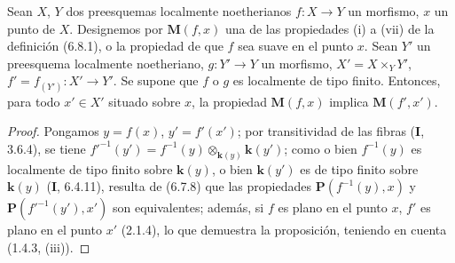 \begin{proposition}[6.8.2]
\label{IV.2.s6.8.2-fr}
Sean $X$, $Y$ dos preesquemas localmente noetherianos $f:X\to Y$ un
morfismo, $x$ un punto de $X$. Designemos por $\boldsymbol{M}(f,x)$ una de las propiedades
\textup{(i)} a \textup{(vii)} de la definición \textup{(6.8.1)}, o la propiedad de que $f$ sea suave en el
punto $x$. Sean $Y'$ un preesquema localmente noetheriano, $g:Y'\to Y$ un
morfismo, $X'=X\times_Y Y'$, $f'=f_{(Y')}:X'\to Y'$. Se supone que $f$
o $g$ es localmente de tipo finito. Entonces, para todo $x'\in X'$ situado
sobre $x$, la propiedad $\boldsymbol{M}(f,x)$ implica $\boldsymbol{M}(f',x')$.
\end{proposition}

\begin{proof}
Pongamos $y=f(x)$, $y'=f'(x')$; por transitividad de las fibras (\textbf{I}, 3.6.4),
se tiene
$f'^{-1}(y')=f^{-1}(y)\otimes_{\mathbf{k}(y)}\boldsymbol{k}(y')$; como o bien $f^{-1}(y)$ es localmente de tipo finito sobre $\boldsymbol{k}(y)$, o bien
$\boldsymbol{k}(y')$ es de tipo finito sobre $\boldsymbol{k}(y)$ (\textbf{I}, 6.4.11), resulta de (6.7.8) que
las propiedades $\boldsymbol{P}(f^{-1}(y),x)$ y $\boldsymbol{P}(f'^{-1}(y'),x')$ son equivalentes;
además, si $f$ es plano en el punto $x$, $f'$ es plano en el punto $x'$
(2.1.4), lo que demuestra la proposición, teniendo en cuenta (1.4.3, (iii)).
\end{proof}
